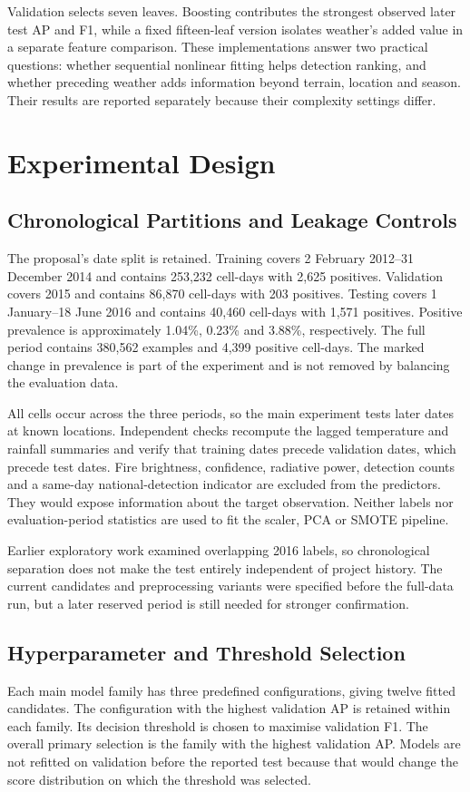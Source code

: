 \documentclass[conference,a4paper]{IEEEtran}
\begin{document}
Validation selects seven leaves. Boosting contributes the strongest observed later test AP and F1, while a fixed fifteen-leaf version isolates weather's added value in a separate feature comparison. These implementations answer two practical questions: whether sequential nonlinear fitting helps detection ranking, and whether preceding weather adds information beyond terrain, location and season. Their results are reported separately because their complexity settings differ.


\section{Experimental Design}
\subsection{Chronological Partitions and Leakage Controls}
The proposal's date split is retained. Training covers 2 February 2012--31 December 2014 and contains 253,232 cell-days with 2,625 positives. Validation covers 2015 and contains 86,870 cell-days with 203 positives. Testing covers 1 January--18 June 2016 and contains 40,460 cell-days with 1,571 positives. Positive prevalence is approximately 1.04\%, 0.23\% and 3.88\%, respectively. The full period contains 380,562 examples and 4,399 positive cell-days. The marked change in prevalence is part of the experiment and is not removed by balancing the evaluation data.

All cells occur across the three periods, so the main experiment tests later dates at known locations. Independent checks recompute the lagged temperature and rainfall summaries and verify that training dates precede validation dates, which precede test dates. Fire brightness, confidence, radiative power, detection counts and a same-day national-detection indicator are excluded from the predictors. They would expose information about the target observation. Neither labels nor evaluation-period statistics are used to fit the scaler, PCA or SMOTE pipeline.

Earlier exploratory work examined overlapping 2016 labels, so chronological separation does not make the test entirely independent of project history. The current candidates and preprocessing variants were specified before the full-data run, but a later reserved period is still needed for stronger confirmation.

\subsection{Hyperparameter and Threshold Selection}
Each main model family has three predefined configurations, giving twelve fitted candidates. The configuration with the highest validation AP is retained within each family. Its decision threshold is chosen to maximise validation F1. The overall primary selection is the family with the highest validation AP. Models are not refitted on validation before the reported test because that would change the score distribution on which the threshold was selected.
\end{document}
